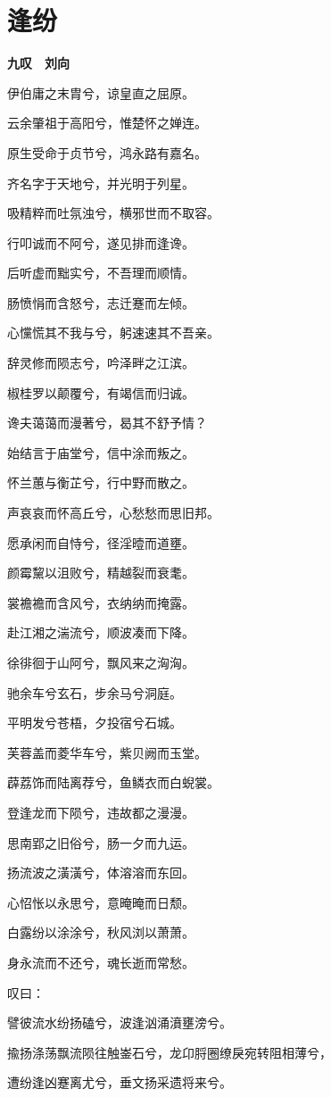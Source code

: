 \documentclass[12pt,a4paper]{ctexbook}
\begin{document}
\section{逢纷}
\textbf{九叹　刘向}\par\vspace{0.5em}
伊伯庸之末胄兮，谅皇直之屈原。\par
云余肇祖于高阳兮，惟楚怀之婵连。\par
原生受命于贞节兮，鸿永路有嘉名。\par
齐名字于天地兮，并光明于列星。\par
吸精粹而吐氛浊兮，横邪世而不取容。\par
行叩诚而不阿兮，遂见排而逢谗。\par
后听虚而黜实兮，不吾理而顺情。\par
肠愤悁而含怒兮，志迁蹇而左倾。\par
心戃慌其不我与兮，躬速速其不吾亲。\par
辞灵修而陨志兮，吟泽畔之江滨。\par
椒桂罗以颠覆兮，有竭信而归诚。\par
谗夫蔼蔼而漫著兮，曷其不舒予情？\par
始结言于庙堂兮，信中涂而叛之。\par
怀兰蕙与衡芷兮，行中野而散之。\par
声哀哀而怀高丘兮，心愁愁而思旧邦。\par
愿承闲而自恃兮，径淫曀而道壅。\par
颜霉黧以沮败兮，精越裂而衰耄。\par
裳襜襜而含风兮，衣纳纳而掩露。\par
赴江湘之湍流兮，顺波凑而下降。\par
徐徘徊于山阿兮，飘风来之洶洶。\par
驰余车兮玄石，步余马兮洞庭。\par
平明发兮苍梧，夕投宿兮石城。\par
芙蓉盖而菱华车兮，紫贝阙而玉堂。\par
薜荔饰而陆离荐兮，鱼鳞衣而白蜺裳。\par
登逢龙而下陨兮，违故都之漫漫。\par
思南郢之旧俗兮，肠一夕而九运。\par
扬流波之潢潢兮，体溶溶而东回。\par
心怊怅以永思兮，意晻晻而日颓。\par
白露纷以涂涂兮，秋风浏以萧萧。\par
身永流而不还兮，魂长逝而常愁。\par
叹曰：\par
譬彼流水纷扬磕兮，波逢汹涌濆壅滂兮。\par
揄扬涤荡飘流陨往触崟石兮，龙卬脟圈缭戾宛转阻相薄兮，\par
遭纷逢凶蹇离尤兮，垂文扬采遗将来兮。\par
\end{document}
